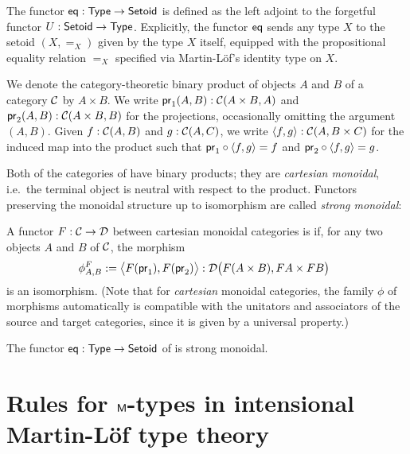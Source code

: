 \documentclass[envcountsame]{llncs}
\begin{document}
\begin{definition}\label{def:eq}
 The functor $\eq : \Set\to\Setoid$ is defined as the left adjoint to the forgetful functor $U : \Setoid \to \Set$.
  Explicitly, the functor $\eq$ sends any type $X$ to the setoid $(X,=_X)$ given by the type $X$ itself, equipped
  with the propositional equality relation $=_X$ specified via Martin-L\"of's identity type on $X$.
\end{definition}


\begin{remark}
  We denote the category-theoretic binary product of objects $A$ and $B$ of a category $\C$ by $A\times B$.
  We write $\pr_1(A,B) : \C(A\times B, A)$ and $\pr_2(A,B) :\C(A\times B, B)$ for the projections, occasionally omitting the 
  argument $(A,B)$.
  Given $f : \C(A, B)$ and $g : \C(A,C)$, we write $\langle f,g\rangle : \C(A,B\times C)$ for the induced map into the product such that
  $\comp{\langle f,g\rangle}{\pr_1} = f$ and $\comp{\langle f,g\rangle}{\pr_2} = g$.
\end{remark}

Both of the categories of  have binary products; they are \emph{cartesian monoidal}, i.e.\ the terminal 
object is neutral with respect to the product. Functors preserving the monoidal structure up to isomorphism
are called \emph{strong monoidal}:

\begin{definition}\label{def:monoidal_functor}
 A functor $F:\C\to\D$ between cartesian monoidal categories is  if, for any two objects $A$ and $B$ of $\C$,
  the morphism
 \[ \phi^F_{A,B} := \bigl\langle F(\pr_1), F(\pr_2) \bigr\rangle : \D\bigl(F(A\times B), FA\times FB\bigr)\enspace  \] 
 is an isomorphism.
 (Note that for \emph{cartesian} monoidal categories, the family $\phi$ of morphisms automatically 
  is compatible with the unitators and associators of the source and target categories, 
  since it is given by a universal property.)
\end{definition}

\begin{example}
  The functor $\eq: \Set \to \Setoid$ of  is strong monoidal.
\end{example}


\section{Rules for $\M$-types in intensional Martin-L\"of type theory}\label{sec:rules}
\end{document}
